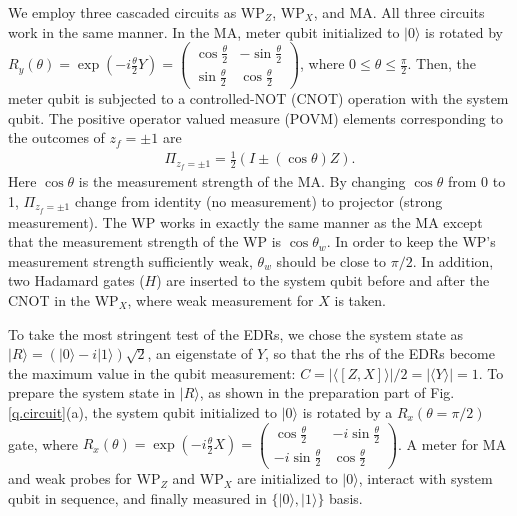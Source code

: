 \documentclass[%
reprint,
superscriptaddress,
 amsmath,amssymb,
 aps,
pra,
]{revtex4-2}
\begin{document}
We employ three cascaded circuits as WP$_Z$, WP$_X$, and MA. All three circuits work in the same manner. 
In the MA, meter qubit initialized to $|0\rangle$ is rotated by 
$R_{y}(\theta)=\exp(-i \frac{\theta}{2} Y ) = 
\begin{pmatrix} 
\cos\frac{\theta}{2} & -\sin\frac{\theta}{2}\\ 
\sin\frac{\theta}{2}  &  \cos\frac{\theta}{2}
\end{pmatrix}$,
where $0\leq\theta\leq \frac{\pi}{2}$.
Then, the meter qubit is subjected to a controlled-NOT (CNOT) operation with the system qubit. 
The positive operator valued measure (POVM) elements corresponding to the outcomes of $z_f=\pm1$ are
\begin{equation}
    \label{eq:POVM}
    \begin{aligned}
        \Pi_{z_f=\pm 1} = \frac{1}{2}(I \pm (\cos\theta) Z).
    \end{aligned}
\end{equation}
Here $\cos\theta$ is the measurement strength of the MA. 
By changing $\cos\theta$  from 0 to 1, $ \Pi_{z_f=\pm 1} $ change from identity (no measurement) to projector (strong measurement). The WP works in exactly the same manner as the MA except that the measurement strength of the WP is $\cos\theta_w$. In order to keep the WP’s measurement strength sufficiently weak, $\theta_w$ should be close to $\pi/2$. In addition, two Hadamard gates ($H$) are inserted to the system qubit before and after the CNOT in the WP$_X$, where weak measurement for $X$ is taken.

To take the most stringent test of the EDRs, we chose the system state as $|R\rangle =( |0\rangle-i|1\rangle)\sqrt{2}$, an eigenstate of $Y$, so that the rhs of the EDRs become the maximum value in the qubit measurement: $C=|\langle[Z, X]\rangle|/2 = |\langle Y\rangle| = 1$. 
To prepare the system state in $|R\rangle$, as shown in the preparation part of Fig. \ref{q.circuit}(a), the system qubit initialized to $|0\rangle$ is rotated by a $R_{x}(\theta=\pi/2)$ gate, 
where 
$R_{x}(\theta)=\exp(-i \frac{\theta}{2} X ) = 
\begin{pmatrix} 
\cos\frac{\theta}{2} & -i\sin\frac{\theta}{2}\\ 
-i\sin\frac{\theta}{2} &  \cos\frac{\theta}{2}
\end{pmatrix}$.
A meter for MA and weak probes for WP$_Z$ and WP$_X$ are initialized to $|0\rangle$, interact with system qubit in sequence, and finally measured in $\{|0\rangle, |1\rangle\}$ basis.
\end{document}
